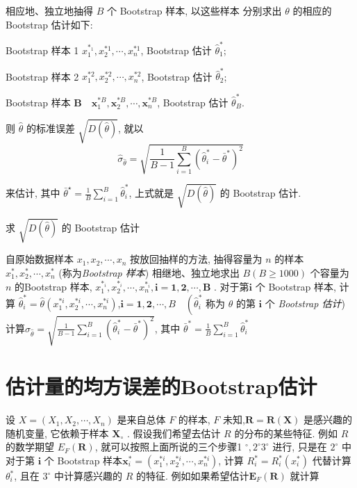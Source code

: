 相应地、独立地抽得 $ B $ 个 Bootstrap 样本, 以这些样本 分别求出 $ \theta $ 的相应的 Bootstrap 估计如下:

Bootstrap 样本 1 $ x_{1}^{*_{1}}, x_{2}^{* 1}, \cdots, x_{n}^{* 1} $, Bootstrap 估计 $ \hat{\theta}_{1}^{*} $;

Bootstrap 样本 2 $ x_{1}^{* 2}, x_{2}^{* 2}, \cdots, x_{n}^{* 2} $, Bootstrap 估计 $ \hat{\theta}_{2}^{*} $;

Bootstrap 样本 $ \boldsymbol{B} \quad \boldsymbol{x}_{1}^{* B}, \boldsymbol{x}_{2}^{* B}, \cdots, \boldsymbol{x}_{n}^{* B} $, Bootstrap 估计 $ \hat{\theta}_{B}^{*} $.

则 $ \hat{\theta} $ 的标准误差 $ \sqrt{D(\hat{\theta})} $, 就以
$$
\hat{\sigma}_{\hat{\theta}}=\sqrt{\frac{1}{B-1} \sum_{i=1}^{B}\left(\hat{\theta}_{i}^{*}-\bar{\theta}^{*}\right)^{2}}
$$

来估计, 其中 $ \bar{\theta}^{\star}=\frac{1}{B} \sum_{i=1}^{B} \hat{\theta}_{i}^{*} $, 上式就是 $ \sqrt{D(\hat{\theta})} $ 的 Bootstrap 估计. 

\begin{algorithm}
    \caption{求 $ \sqrt{D(\hat{\theta})} $ 的 Bootstrap 估计}
    自原始数据样本 $ x_{1}, x_{2}, \cdots, x_{n} $ 按放回抽样的方法, 抽得容量为 $ n $ 的样本 $ x_{1}^{*}, x_{2}^{*}, \cdots, x_{n}^{*} $ (称为\textit{Bootstrap 样本})\;
    相继地、独立地求出 $ B(B \geq 1000) $ 个容量为 $ n $ 的Bootstrap 样本, $ x_{1}^{*_{i}}, x_{2}^{*_{i}}, \cdots, x_{n}^{*_{i}}, \boldsymbol{i}=\mathbf{1}, \mathbf{2}, \cdots, \boldsymbol{B} $ .  对于第$ \boldsymbol{i} $ 个 Bootstrap 样本, 计算 $ \hat{\theta}_{i}^{*}=\hat{\theta}\left(x_{1}^{* i}, x_{2}^{* i}, \cdots, x_{n}^{* i}\right) $,$ \boldsymbol{i}=\mathbf{1}, \mathbf{2}, \cdots, B \quad\left(\hat{\theta}_{i}^{*}\right. $ 称为 $ \theta $ 的第 $ \boldsymbol{i} $ 个 \textit{Bootstrap 估计})\;
    计算$ \hat{\sigma}_{\hat{\theta}}=\sqrt{\frac{1}{B-1} \sum_{i=1}^{B}\left(\hat{\theta}_{i}^{*}-\bar{\theta}^{*}\right)^{2}} $, 其中 $ \bar{\theta}^{*}=\frac{1}{B} \sum_{i=1}^{B} \hat{\theta}_{i}^{*} $
\end{algorithm}

\section{估计量的均方误差的Bootstrap估计}

设 $ X=\left(X_{1}, X_{2}, \cdots, X_{n}\right) $ 是来自总体 $ F $ 的样本, $ F $ 未知,$ \boldsymbol{R}=\boldsymbol{R}(\boldsymbol{X}) $ 是感兴趣的随机变量, 它依赖于样本 $ \boldsymbol{X}_{\circ} $ . 假设我们希望去估计 $ R $ 的分布的某些特征. 例如 $ R $ 的数学期望 $ E_{F}(\boldsymbol{R}) $, 就可以按照上面所说的三个步骤1 $ ^{\circ}, 2^{\circ} $$ 3^{\circ} $ 进行, 只是在 $ 2^{\circ} $ 中对于第 $ \boldsymbol{i} $ 个 Bootstrap 样本$ \boldsymbol{x}_{i}^{*}=\left(x_{1}^{* i}, x_{2}^{* i}, \cdots, x_{n}^{* i}\right) $, 计算 $ R_{i}^{*}=R_{i}^{*}\left(x_{i}^{*}\right) $ 代替计算 $ \theta_{i}^{*} $, 且在 $ 3^{\circ} $ 中计算感兴趣的 $ R $ 的特征. 例如如果希望估计$ \boldsymbol{E}_{F}(\boldsymbol{R}) $ 就计算

